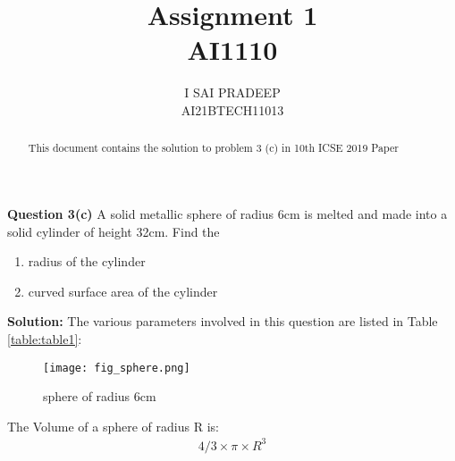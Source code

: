 \documentclass[journal,12pt,twocolumn]{IEEEtran}
\begin{document}
	\title{\huge{Assignment 1}\\AI1110}
	\author{\Large{I SAI PRADEEP}\\AI21BTECH11013}
	\maketitle
	\begin{abstract}
		This document contains the solution to problem 3 (c) in 10th ICSE 2019 Paper
	\end{abstract}
	
	\noindent \textbf{Question 3(c)} A solid metallic sphere of radius 6cm is melted and made into a solid cylinder of height 32cm. Find the
	\begin{enumerate}[label=(\roman*)]
		\item radius of the cylinder
		\item curved surface area of the cylinder
	\end{enumerate}	

	\textbf{Solution:} The various parameters involved in this question are listed in Table \eqref{table:table1}:
	\begin{table}[!ht]
		
		\caption{}
		\label{table:table1}	
	\end{table}

\begin{figure}[h!]
	\centering
	\texttt{[image: fig\_sphere.png]}
	\caption{sphere of radius 6cm}
	\label{sphere}
\end{figure}

	The Volume of a sphere of radius R is:
	\begin{align} 
		4/3 \times \pi \times R^3
	\end{align}
	
\end{document}
